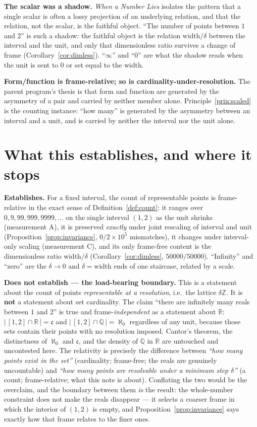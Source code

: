 \documentclass[11pt]{article}
\theoremstyle{definition}
\theoremstyle{plain}
\newcommand{\Z}{\mathbb{Z}}
\newcommand{\R}{\mathbb{R}}
\newcommand{\Q}{\mathbb{Q}}
\begin{document}
\textbf{The scalar was a shadow.} \textit{When a Number Lies} isolates the pattern that a single scalar
is often a lossy projection of an underlying relation, and that the relation, not the scalar, is the
faithful object. ``The number of points between $1$ and $2$'' is such a shadow: the faithful object is
the relation $\mathrm{width}/\delta$ between the interval and the unit, and only that dimensionless
ratio survives a change of frame (Corollary~\ref{cor:dimless}). ``$\infty$'' and ``$0$'' are what the
shadow reads when the unit is sent to $0$ or set equal to the width.

\textbf{Form/function is frame-relative; so is cardinality-under-resolution.} The parent program's
thesis is that form and function are generated by the asymmetry of a pair and carried by neither member
alone. Principle~\ref{prin:scaled} is the counting instance: ``how many'' is generated by the asymmetry
between an interval and a unit, and is carried by neither the interval nor the unit alone.

\section{What this establishes, and where it stops}\label{sec:scope}

\textbf{Establishes.} For a fixed interval, the count of representable points is frame-relative in the
exact sense of Definition~\ref{def:count}: it ranges over $0,9,99,999,9999,\dots$ on the single interval
$(1,2)$ as the unit shrinks (measurement A), it is preserved \emph{exactly} under joint rescaling of
interval and unit (Proposition~\ref{prop:invariance}, $0/2\!\times\!10^5$ mismatches), it changes under
interval-only scaling (measurement C), and its only frame-free content is the dimensionless ratio
$\mathrm{width}/\delta$ (Corollary~\ref{cor:dimless}, $50000/50000$). ``Infinity'' and ``zero'' are the
$\delta\to0$ and $\delta=\mathrm{width}$ ends of one staircase, related by a scale.

\textbf{Does not establish --- the load-bearing boundary.} This is a statement about the count of
points \emph{representable at a resolution}, i.e.\ the lattice $\delta\Z$. It is \textbf{not} a statement
about set cardinality. The claim ``there are infinitely many reals between $1$ and $2$'' is true and
frame-\emph{independent} as a statement about $\R$: $|\,[1,2]\cap\R\,|=\mathfrak{c}$ and
$|\,[1,2]\cap\Q\,|=\aleph_0$ regardless of any unit, because those sets contain their points with no
resolution imposed. Cantor's theorem, the distinctness of $\aleph_0$ and $\mathfrak c$, and the density
of $\Q$ in $\R$ are untouched and uncontested here. The relativity is precisely the difference between
\emph{``how many points exist in the set''} (cardinality; frame-free; the reals are genuinely
uncountable) and \emph{``how many points are resolvable under a minimum step $\delta$''} (a count;
frame-relative; what this note is about). Conflating the two would be the overclaim, and the boundary
between them \emph{is} the result: the whole-number constraint does not make the reals disappear --- it
selects a coarser frame in which the interior of $(1,2)$ is empty, and Proposition~\ref{prop:invariance}
says exactly how that frame relates to the finer ones.
\end{document}
